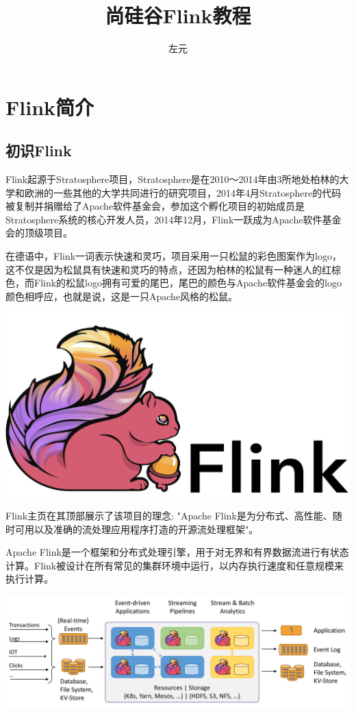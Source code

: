 \documentclass{ctexart}
\title{尚硅谷Flink教程}
\author{左元}
\date{ }
\begin{document}
\maketitle

\tableofcontents

\section{Flink简介}

\subsection{初识Flink}

Flink起源于Stratosphere项目，Stratosphere是在2010～2014年由3所地处柏林的大学和欧洲的一些其他的大学共同进行的研究项目，2014年4月Stratosphere的代码被复制并捐赠给了Apache软件基金会，参加这个孵化项目的初始成员是Stratosphere系统的核心开发人员，2014年12月，Flink一跃成为Apache软件基金会的顶级项目。

在德语中，Flink一词表示快速和灵巧，项目采用一只松鼠的彩色图案作为logo，这不仅是因为松鼠具有快速和灵巧的特点，还因为柏林的松鼠有一种迷人的红棕色，而Flink的松鼠logo拥有可爱的尾巴，尾巴的颜色与Apache软件基金会的logo颜色相呼应，也就是说，这是一只Apache风格的松鼠。

\includegraphics[width=\textwidth]{flink-header-logo.png}

Flink主页在其顶部展示了该项目的理念: "Apache Flink是为分布式、高性能、随时可用以及准确的流处理应用程序打造的开源流处理框架"。

Apache Flink是一个框架和分布式处理引擎，用于对无界和有界数据流进行有状态计算。Flink被设计在所有常见的集群环境中运行，以内存执行速度和任意规模来执行计算。

\includegraphics[width=\textwidth]{flink-home-graphic.png}
\end{document}
